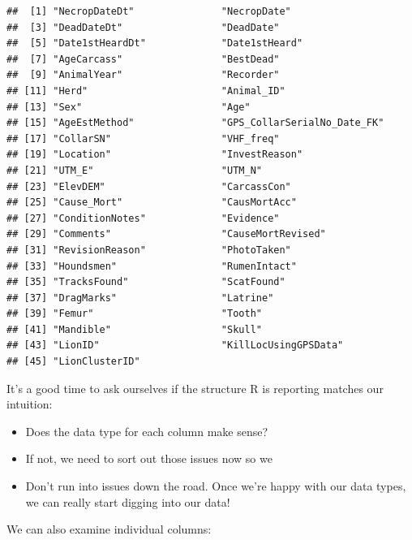 \documentclass[
]{book}
\newenvironment{Shaded}{\begin{snugshade}}{\end{snugshade}}
\newcommand{\FunctionTok}[1]{\textcolor[rgb]{0.13,0.29,0.53}{\textbf{#1}}}
\newcommand{\NormalTok}[1]{#1}
\newcommand{\SpecialCharTok}[1]{\textcolor[rgb]{0.81,0.36,0.00}{\textbf{#1}}}
\providecommand{\tightlist}{%
  \setlength{\itemsep}{0pt}\setlength{\parskip}{0pt}}
\begin{document}
\begin{verbatim}
##  [1] "NecropDateDt"               "NecropDate"                
##  [3] "DeadDateDt"                 "DeadDate"                  
##  [5] "Date1stHeardDt"             "Date1stHeard"              
##  [7] "AgeCarcass"                 "BestDead"                  
##  [9] "AnimalYear"                 "Recorder"                  
## [11] "Herd"                       "Animal_ID"                 
## [13] "Sex"                        "Age"                       
## [15] "AgeEstMethod"               "GPS_CollarSerialNo_Date_FK"
## [17] "CollarSN"                   "VHF_freq"                  
## [19] "Location"                   "InvestReason"              
## [21] "UTM_E"                      "UTM_N"                     
## [23] "ElevDEM"                    "CarcassCon"                
## [25] "Cause_Mort"                 "CausMortAcc"               
## [27] "ConditionNotes"             "Evidence"                  
## [29] "Comments"                   "CauseMortRevised"          
## [31] "RevisionReason"             "PhotoTaken"                
## [33] "Houndsmen"                  "RumenIntact"               
## [35] "TracksFound"                "ScatFound"                 
## [37] "DragMarks"                  "Latrine"                   
## [39] "Femur"                      "Tooth"                     
## [41] "Mandible"                   "Skull"                     
## [43] "LionID"                     "KillLocUsingGPSData"       
## [45] "LionClusterID"
\end{verbatim}

It's a good time to ask ourselves if the structure R is reporting matches our intuition:

\begin{itemize}
\tightlist
\item
  Does the data type for each column make sense?
\item
  If not, we need to sort out those issues now so we
\item
  Don't run into issues down the road. Once we're happy with our data types, we can really start digging into our data!
\end{itemize}

We can also examine individual columns:

\begin{Shaded}
\end{Shaded}
\end{document}
